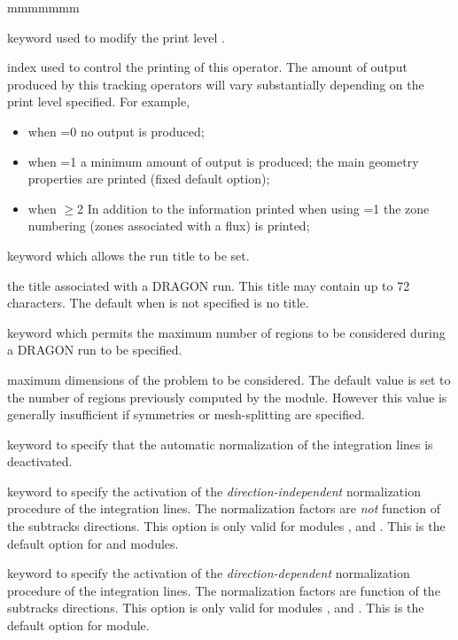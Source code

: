 \begin{ListeDeDescription}{mmmmmmm}

\item[\moc{EDIT}] keyword used to modify the print level .

\item[\dusa{iprint}] index used to control the printing of this operator. The
amount of output produced by this tracking operators will vary substantially
depending on the print level specified. For example,

\begin{itemize}

\item when =0 no output is produced;

\item when =1 a minimum amount of output is produced; the 
main geometry properties are printed (fixed default option);

\item when $\ge$2 In addition to the information printed when
using =1 the zone numbering (zones associated with a flux) is
printed;

\end{itemize}

\item[\moc{TITL}] keyword which allows the run title to be set.

\item[\dusa{TITLE}] the title associated with a DRAGON run. This
title may contain up to 72 characters. The default when   is not
specified is no title.

\item[\moc{MAXR}] keyword which permits the maximum number of regions to be
considered during a DRAGON run to be specified.

\item[\dusa{maxreg}] maximum dimensions of the problem to be considered.  The
default value is set to the number of regions previously computed by the
 module. However this value is generally insufficient if symmetries or
mesh-splitting are specified.

\item[\moc{NORE}] keyword to specify that the automatic normalization of the integration lines is deactivated.

\item[\moc{RENO}]  keyword to specify the activation of the {\sl direction-independent} normalization procedure of the
integration lines. The normalization factors are {\sl not} function of the subtracks directions. This option is only
valid for modules ,  and . This is the default option for  and 
modules.

\item[\moc{REND}]  keyword to specify the activation of the {\sl direction-dependent} normalization procedure of the
integration lines. The normalization factors are function of the subtracks directions. This option is only valid for
modules ,  and . This is the default option for  module.

\end{ListeDeDescription}
